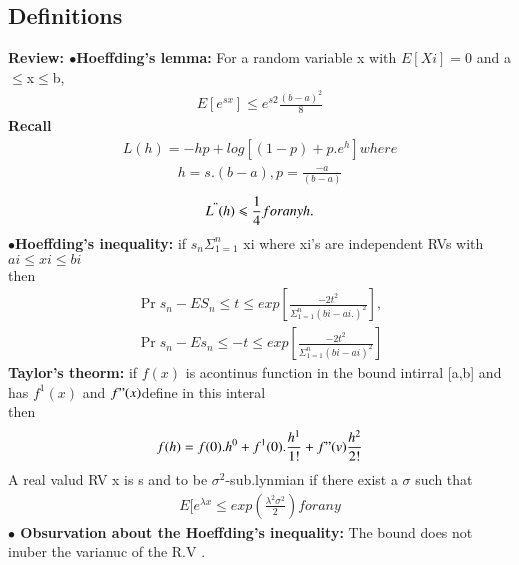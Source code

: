 \documentclass[journal,12pt,twocolumn]{IEEEtran}
\begin{document}
\subsection{Definitions}
\textbf{Review: $\bullet$Hoeffding's lemma:} For a random variable x with $E[Xi]=0$ and a$\leqslant$x$\leqslant$b,\begin{align}
E[e^{sx}]\leqslant e^{s2}\frac{(b-a)^2}{8}
\end{align}
\textbf{Recall}
\begin{align}
L(h)=-hp+log [(1-p)+p.e^h] where
\end{align}
\begin{align}
h=s.(b-a),p=\frac{-a}{(b-a)}
\end{align}
\begin{align}
L^"(h) \leqslant \frac{1}{4} for any h.
\end{align}
\textbf{$\bullet$Hoeffding's inequality:} if $s_n \Sigma_{1=1}^{n}$ xi where xi's are independent RVs with $ai\leqslant xi \leqslant bi$ \\
then
\begin{align}
\Pr{s_n-ES_n \leqslant t} \leqslant exp[\frac{-2t^2}{\Sigma_{1=1}^{n}(bi-ai.)^2}],
\end{align}
\begin{align}
\Pr{s_n-Es_n \leqslant -t} \leqslant exp[\frac{-2t^2}{\Sigma_{1=1}^{n}(bi-ai)^2}]
\end{align}
\textbf{Taylor's theorm:} if $f(x)$ is acontinus function in the bound intirral [a,b] and has $f^1(x)$ and $f"(x)$define in this interal \\
then
\begin{align}
f(h)=f(0).h^0+f^1(0).\frac{h^1}{1!}+f"(v)\frac{h^2}{2!}
\end{align}
 A real valud RV x is  s and to be $\sigma^2$-sub.lynmian if there exist a $\sigma$ such that 
\begin{align}
E[e^{\lambda x} \leqslant exp(\frac{\lambda^2 \sigma^2}{2}) for any 
\end{align}
\textbf{$\bullet$ Obsurvation about the Hoeffding's inequality:} The bound does not inuber the  varianuc of the R.V .\\
\end{document}
